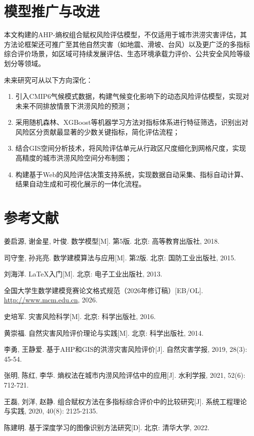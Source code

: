 \documentclass[12pt]{article}
\begin{document}
\section{模型推广与改进}

本文构建的AHP-熵权组合赋权风险评估模型，不仅适用于城市洪涝灾害评估，其方法论框架还可推广至其他自然灾害（如地震、滑坡、台风）以及更广泛的多指标综合评价场景，如区域可持续发展评估、生态环境承载力评价、公共安全风险等级划分等领域。

未来研究可从以下方向深化：

\begin{enumerate}[label=(\arabic*)]
    \item 引入CMIP6气候模式数据，构建气候变化影响下的动态风险评估模型，实现对未来不同排放情景下洪涝风险的预测；
    \item 采用随机森林、XGBoost等机器学习方法对指标体系进行特征筛选，识别出对风险区分贡献最显著的少数关键指标，简化评估流程；
    \item 结合GIS空间分析技术，将风险评估单元从行政区尺度细化到网格尺度，实现高精度的城市洪涝风险空间分布制图；
    \item 构建基于Web的风险评估决策支持系统，实现数据自动采集、指标自动计算、结果自动生成和可视化展示的一体化流程。
\end{enumerate}

\section*{参考文献}
\begin{enumerate}[label={[\arabic*]}, nosep]
    \item 姜启源, 谢金星, 叶俊. 数学模型[M]. 第5版. 北京: 高等教育出版社, 2018.
    \item 司守奎, 孙兆亮. 数学建模算法与应用[M]. 第2版. 北京: 国防工业出版社, 2015.
    \item 刘海洋. \LaTeX{}入门[M]. 北京: 电子工业出版社, 2013.
    \item 全国大学生数学建模竞赛论文格式规范（2026年修订稿）[EB/OL]. \url{http://www.mcm.edu.cn}, 2026.
    \item 史培军. 灾害风险科学[M]. 北京: 科学出版社, 2016.
    \item 黄崇福. 自然灾害风险评价理论与实践[M]. 北京: 科学出版社, 2014.
    \item 李勇, 王静爱. 基于AHP和GIS的洪涝灾害风险评价[J]. 自然灾害学报, 2019, 28(3): 45-54.
    \item 张明, 陈红, 李华. 熵权法在城市内涝风险评估中的应用[J]. 水利学报, 2021, 52(6): 712-721.
    \item 王磊, 刘洋, 赵静. 组合赋权方法在多指标综合评价中的比较研究[J]. 系统工程理论与实践, 2020, 40(8): 2125-2135.
    \item 陈建明. 基于深度学习的图像识别方法研究[D]. 北京: 清华大学, 2022.
\end{enumerate}
\end{document}
